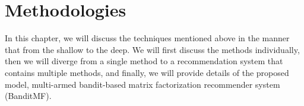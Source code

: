 \chapter{Methodologies}
In this chapter, we will discuss the techniques mentioned above in the manner that from the shallow to the deep. We will first discuss the methods individually, then we will diverge from a single method to a recommendation system that contains multiple methods, and finally, we will provide details of the proposed model, multi-armed bandit-based matrix factorization recommender system (BanditMF).




